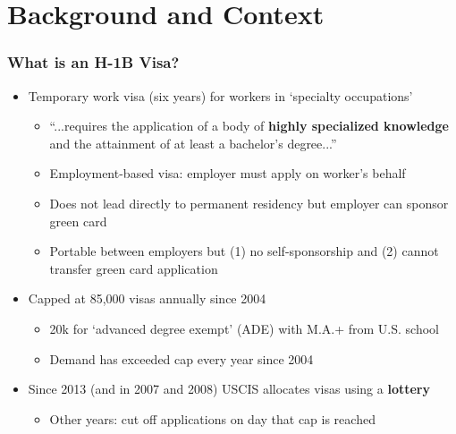 \documentclass[xcolor=dvipsnames, compress, 12pt, aspectratio=169, handout]{beamer}
\begin{document}
\section{Background and Context}
\begin{frame}\label{h1b_visa_allocation}
    \frametitle{What is an H-1B Visa?}
    \begin{itemize}
        \item Temporary work visa (six years) for workers in `specialty occupations'
        \begin{itemize}
            \item ``...requires the application of a body of \textbf{highly specialized knowledge} and the attainment of at least a bachelor’s degree...''
            \item Employment-based visa: employer must apply on worker's behalf 
            \item Does not lead directly to permanent residency but employer can sponsor green card
            \item Portable between employers but (1) no self-sponsorship and (2) cannot transfer green card application
        \end{itemize}
        \vspace{2mm}
        \item Capped at 85,000 visas annually since 2004
            \begin{itemize}
                \item 20k for `advanced degree exempt' (ADE) with M.A.+ from U.S. school
                \item Demand has exceeded cap every year since 2004 \hyperlink{h1b_apps_by_year}{} 
            \end{itemize}
        \vspace{2mm}
        \item Since 2013 (and in 2007 and 2008) USCIS allocates visas using a \textbf{lottery} \hyperlink{timeline}{} 
            \begin{itemize}
                \item Other years: cut off applications on day that cap is reached
            \end{itemize}
    \end{itemize}
\end{frame}
\end{document}
